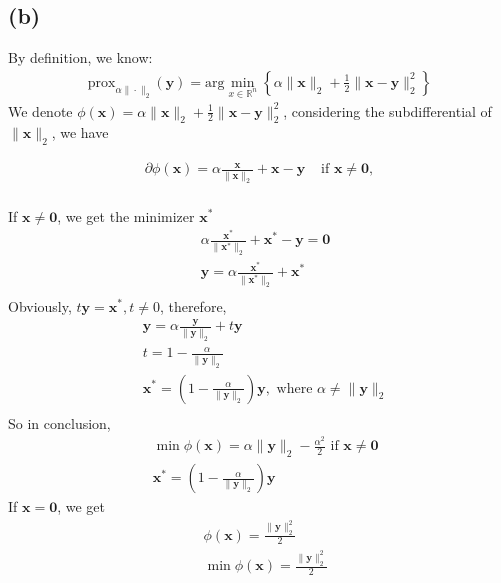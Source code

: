 \documentclass{article}
\newcommand{\R}{\mathbb{R}}
\begin{document}
\subsection*{(b)}
By definition, we know:
\begin{align*}
    \text{prox}_{\alpha \|\cdot\|_2} (\bm{y}) = \text{arg} \min_{x \in \R^n} \left\{ \alpha\|\bm{x}\|_2 + \frac{1}{2} \|\bm{x} - \bm{y}\|_2^2\right\}
\end{align*}
We denote \(\phi(\bm{x}) = \alpha\|\bm{x}\|_2 + \frac{1}{2} \|\bm{x} - \bm{y}\|_2^2\), considering the subdifferential of \(\|\bm{x}\|_2\), we have

\begin{align*}
    \partial \phi(\bm{x}) = 
        \alpha \frac{\bm{x}}{\|\bm{x}\|_2} + \bm{x} - \bm{y} &\text{  if } \bm{x} \ne \bm{0}, \\
\end{align*}

If \(\bm{x} \ne \bm{0}\), we get the minimizer \(\bm{x}^*\)
\begin{align*}
    &\alpha \frac{\bm{x}^*}{\|\bm{x}^*\|_2} + \bm{x}^* - \bm{y} = \bm{0} \\
    &\bm{y} = \alpha \frac{\bm{x}^*}{\|\bm{x}^*\|_2} + \bm{x}^* \\
\end{align*}
Obviously, \(t\bm{y} = \bm{x}^*, t \ne 0\), therefore,
\begin{align*}
    &\bm{y} = \alpha \frac{\bm{y}}{\|\bm{y}\|_2} + t\bm{y} \\
    &t = 1 - \frac{\alpha}{\|\bm{y}\|_2} \\
    &\bm{x}^* = (1 - \frac{\alpha}{\|\bm{y}\|_2})\bm{y} , \text{ where  } \alpha \ne \|\bm{y}\|_2\\
\end{align*}
So in conclusion, 
\begin{align*}
    &\min \phi(\bm{x}) = \alpha\|\bm{y}\|_2 - \frac{\alpha^2}{2} \text{  if  } \bm{x} \ne \bm{0} \\
    &\bm{x}^* = (1 - \frac{\alpha}{\|\bm{y}\|_2})\bm{y}
\end{align*}
If \(\bm{x} = \bm{0}\), we get
\begin{align*}
    &\phi(\bm{x}) = \frac{\|\bm{y}\|_2^2}{2} \\
    &\min \phi(\bm{x}) = \frac{\|\bm{y}\|_2^2}{2} \\
\end{align*}
\end{document}
